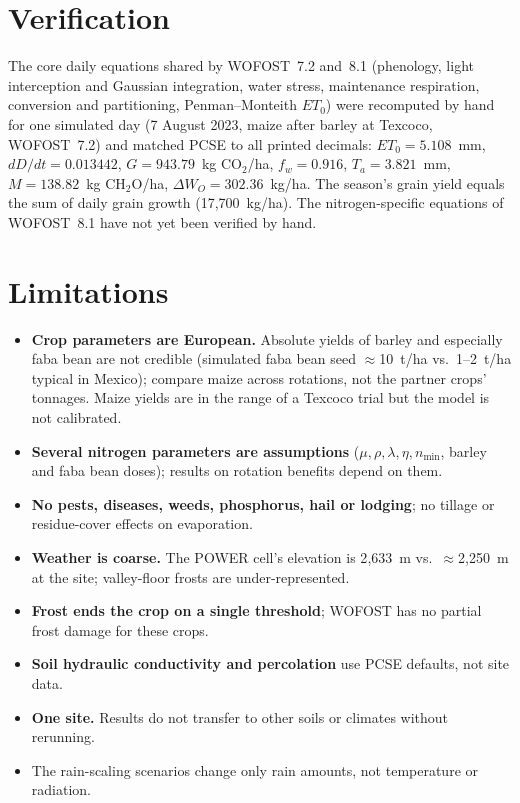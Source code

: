 \documentclass[11pt,a4paper]{article}
\begin{document}
\section{Verification}\label{sec:verification}

The core daily equations shared by WOFOST~7.2 and~8.1 (phenology, light interception and Gaussian integration,
water stress, maintenance respiration, conversion and partitioning, Penman--Monteith \(ET_0\)) were recomputed by
hand for one simulated day (7 August 2023, maize after barley at Texcoco, WOFOST~7.2) and matched PCSE to all
printed decimals: \(ET_0 = 5.108\)~mm, \(dD/dt = 0.013442\), \(G = 943.79\)~kg CO\(_2\)/ha, \(f_w = 0.916\),
\(T_a = 3.821\)~mm, \(M = 138.82\)~kg CH\(_2\)O/ha, \(\Delta W_O = 302.36\)~kg/ha. The season's grain yield equals the
sum of daily grain growth (17{,}700~kg/ha). The nitrogen-specific equations of WOFOST~8.1 have not yet been verified
by hand.

\section{Limitations}\label{sec:limitations}

\begin{itemize}[nosep]
  \item \textbf{Crop parameters are European.} Absolute yields of barley and especially faba bean are not credible
        (simulated faba bean seed \(\approx\)10~t/ha vs.\ 1--2~t/ha typical in Mexico); compare maize across rotations,
        not the partner crops' tonnages. Maize yields are in the range of a Texcoco trial \citep{alonso2023terra} but
        the model is not calibrated.
  \item \textbf{Several nitrogen parameters are assumptions} (\(\mu, \rho, \lambda, \eta, n_{\min}\), barley and faba
        bean doses); results on rotation benefits depend on them.
  \item \textbf{No pests, diseases, weeds, phosphorus, hail or lodging}; no tillage or residue-cover effects on
        evaporation.
  \item \textbf{Weather is coarse.} The POWER cell's elevation is 2{,}633~m vs.\ \(\approx\)2{,}250~m at the site;
        valley-floor frosts are under-represented.
  \item \textbf{Frost ends the crop on a single threshold}; WOFOST has no partial frost damage for these crops.
  \item \textbf{Soil hydraulic conductivity and percolation} use PCSE defaults, not site data.
  \item \textbf{One site.} Results do not transfer to other soils or climates without rerunning.
  \item The rain-scaling scenarios change only rain amounts, not temperature or radiation.
\end{itemize}
\end{document}
